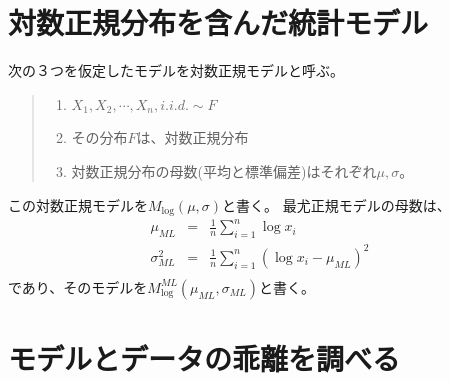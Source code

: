 


\section{対数正規分布を含んだ統計モデル}
次の３つを仮定したモデルを対数正規モデルと呼ぶ。
\begin{quote}
    \begin{enumerate}[(1)]
    \item $X_1,X_2,\cdots,X_n, i.i.d. \sim F$
    \item その分布$F$は、対数正規分布
    \item 対数正規分布の母数(平均と標準偏差)はそれぞれ$\mu,\sigma$。
    \end{enumerate}
\end{quote}

この対数正規モデルを$M_{\log}(\mu,\sigma)$と書く。
最尤正規モデルの母数は、
\begin{eqnarray*}
 \mu_{ML} &=& \frac{1}{n}\sum_{i=1}^{n} \log x_i \\
 \sigma^2_{ML}&=& \frac{1}{n}\sum_{i=1}^{n} (\log x_i  -\mu_{ML})^2 \\
\end{eqnarray*}
であり、そのモデルを$M^{ML}_{\log}(\mu_{ML},\sigma_{ML})$と書く。



\section{モデルとデータの乖離を調べる}

